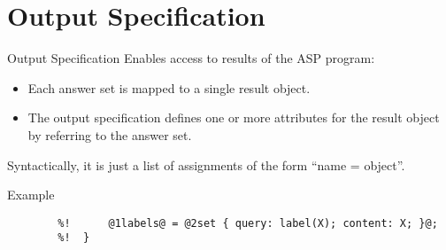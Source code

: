 \documentclass[%
beamer,%
english,%
10pt,%
]{beamer}
\newcommand{\blue}[1]{{\color{blue}#1}}
\newcommand{\orange}[1]{{\color{orange}#1}}
\begin{document}
\section{Output Specification}

\begin{frame}[fragile]{Output Specification}
    Enables access to results of the ASP program:

    \begin{itemize}
        \item Each answer set is mapped to a single result object.
        \item The output specification defines one or more attributes for the result object by referring to the answer set.
    \end{itemize}

    \medskip
    Syntactically, it is just a list of assignments of the form ``\blue{name} = \orange{object}''.

    \begin{exampleblock}{Example}
        \begin{lstlisting}[escapechar=`,basicstyle=\footnotesize,autogobble,moredelim={**[is][\color{blue}]{@1}{@}},moredelim={**[is][\color{orange}]{@2}{@}}]
        %!  OUTPUT {
        %!      @1labels@ = @2set { query: label(X); content: X; }@;
        %!  }
        \end{lstlisting}
    \end{exampleblock}
\end{frame}
\end{document}
